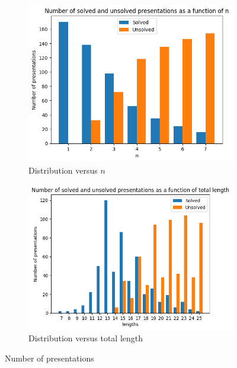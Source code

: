 \begin{figure}
	\centering
	\begin{subfigure}[b]{0.5\textwidth}
		\includegraphics[width=\textwidth]{fig/hist_vs_n.png}
		\caption{Distribution versus $n$}
		\label{fig:hist_vs_n}
	\end{subfigure}%
	\begin{subfigure}[b]{0.5\textwidth}
		\centering
		\includegraphics[width=\textwidth]{fig/hist_vs_lengths.png}
		\caption{Distribution versus total length}
		\label{fig:hist_vs_length}
	\end{subfigure}
	\caption{Number of presentations}\label{fig:miller_schupp_statistics}
\end{figure}

